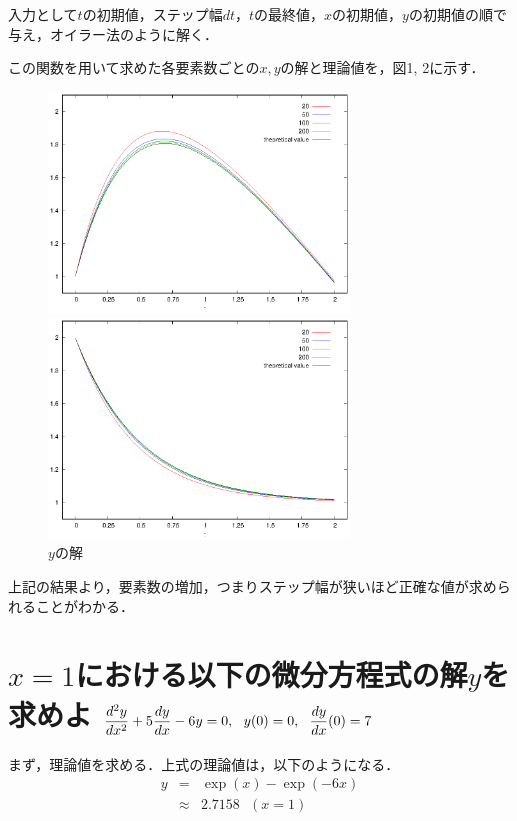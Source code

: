 \documentclass[dvipdfmx,titlepage]{jsarticle}
\begin{document}
入力として$t$の初期値，ステップ幅$dt$，$t$の最終値，$x$の初期値，$y$の初期値の順で与え，オイラー法のように解く．

この関数を用いて求めた各要素数ごとの$x, y$の解と理論値を，図1, 2に示す．

\begin{figure}[h]
\begin{minipage}{0.5\hsize}
	\centering
	\includegraphics[width=8cm]{x.eps}
	\caption{$xの解$}
	\label{fig:4-1}
\end{minipage}
\begin{minipage}{0.5\hsize}
	\centering
	\includegraphics[width=8cm]{y.eps}
	\caption{$yの解$}
	\label{fig:4-2}
\end{minipage}
\label{fig:5}
\end{figure}

上記の結果より，要素数の増加，つまりステップ幅が狭いほど正確な値が求められることがわかる．

\section{$x = 1$における以下の微分方程式の解$y$を求めよ\protect\linebreak
$\dfrac{d^2y}{dx^2} + 5\dfrac{dy}{dx} - 6y = 0, \:\:\:y(0) = 0, \:\:\:\dfrac{dy}{dx}(0) = 7\raisebox{4ex}{\mbox{}}$}
\:

まず，理論値を求める．上式の理論値は，以下のようになる．
\begin{eqnarray}
y &=& \exp(x) - \exp(-6x) \nonumber\\
&\approx& 2.7158\:\:\:(x = 1)\nonumber
\end{eqnarray}
\end{document}
